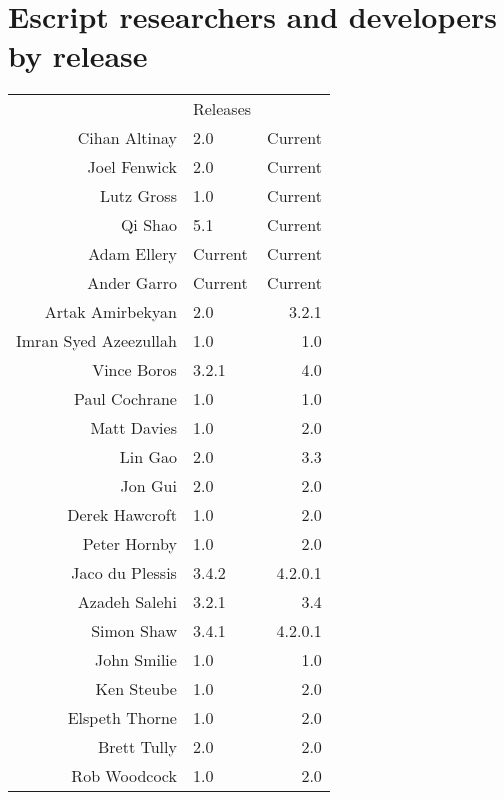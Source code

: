 
%
%
%

\chapter{Escript researchers and developers by release}

\begin{center}
\begin{tabular}{r|lr|}
& Releases\\ \cline{2-3}
Cihan Altinay & 2.0 & Current \\
Joel Fenwick & 2.0 & Current \\
Lutz Gross & 1.0 & Current \\
Qi Shao & 5.1 & Current \\
Adam Ellery & Current & Current \\
Ander Garro & Current & Current \\
	\cline{1-3}  	
Artak Amirbekyan & 2.0 & 3.2.1 \\
Imran Syed Azeezullah & 1.0 & 1.0 \\
Vince Boros & 3.2.1 & 4.0 \\
Paul Cochrane & 1.0 & 1.0 \\
Matt Davies & 1.0 & 2.0 \\
Lin Gao & 2.0 & 3.3 \\
Jon Gui & 2.0 & 2.0 \\
Derek Hawcroft & 1.0 & 2.0 \\
Peter Hornby & 1.0 & 2.0 \\
Jaco du Plessis & 3.4.2 & 4.2.0.1 \\
Azadeh Salehi & 3.2.1 & 3.4 \\
Simon Shaw & 3.4.1 & 4.2.0.1 \\
John Smilie & 1.0 & 1.0 \\
Ken Steube & 1.0 & 2.0 \\
Elspeth Thorne & 1.0 & 2.0 \\
Brett Tully & 2.0 & 2.0 \\
Rob Woodcock & 1.0 & 2.0 \\
\cline{2-3}
\end{tabular}
\end{center}
